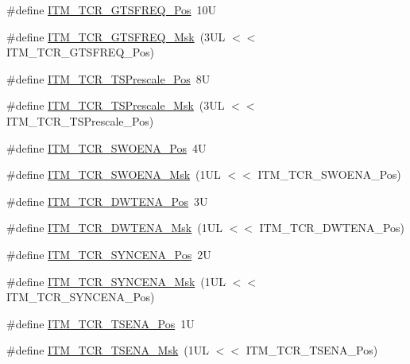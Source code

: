 \begin{DoxyCompactItemize}
\item 
\#define \hyperlink{group___c_m_s_i_s___i_t_m_ga96c7c7cbc0d98426c408090b41f583f1}{I\+T\+M\+\_\+\+T\+C\+R\+\_\+\+G\+T\+S\+F\+R\+E\+Q\+\_\+\+Pos}~10U
\item 
\#define \hyperlink{group___c_m_s_i_s___i_t_m_gade862cf009827f7f6748fc44c541b067}{I\+T\+M\+\_\+\+T\+C\+R\+\_\+\+G\+T\+S\+F\+R\+E\+Q\+\_\+\+Msk}~(3\+U\+L $<$$<$ I\+T\+M\+\_\+\+T\+C\+R\+\_\+\+G\+T\+S\+F\+R\+E\+Q\+\_\+\+Pos)
\item 
\#define \hyperlink{group___c_m_s_i_s___i_t_m_gad7bc9ee1732032c6e0de035f0978e473}{I\+T\+M\+\_\+\+T\+C\+R\+\_\+\+T\+S\+Prescale\+\_\+\+Pos}~8U
\item 
\#define \hyperlink{group___c_m_s_i_s___i_t_m_ga7a723f71bfb0204c264d8dbe8cc7ae52}{I\+T\+M\+\_\+\+T\+C\+R\+\_\+\+T\+S\+Prescale\+\_\+\+Msk}~(3\+U\+L $<$$<$ I\+T\+M\+\_\+\+T\+C\+R\+\_\+\+T\+S\+Prescale\+\_\+\+Pos)
\item 
\#define \hyperlink{group___c_m_s_i_s___i_t_m_ga7a380f0c8078f6560051406583ecd6a5}{I\+T\+M\+\_\+\+T\+C\+R\+\_\+\+S\+W\+O\+E\+N\+A\+\_\+\+Pos}~4U
\item 
\#define \hyperlink{group___c_m_s_i_s___i_t_m_ga97476cb65bab16a328b35f81fd02010a}{I\+T\+M\+\_\+\+T\+C\+R\+\_\+\+S\+W\+O\+E\+N\+A\+\_\+\+Msk}~(1\+U\+L $<$$<$ I\+T\+M\+\_\+\+T\+C\+R\+\_\+\+S\+W\+O\+E\+N\+A\+\_\+\+Pos)
\item 
\#define \hyperlink{group___c_m_s_i_s___i_t_m_ga30e83ebb33aa766070fe3d1f27ae820e}{I\+T\+M\+\_\+\+T\+C\+R\+\_\+\+D\+W\+T\+E\+N\+A\+\_\+\+Pos}~3U
\item 
\#define \hyperlink{group___c_m_s_i_s___i_t_m_ga98ea1c596d43d3633a202f9ee746cf70}{I\+T\+M\+\_\+\+T\+C\+R\+\_\+\+D\+W\+T\+E\+N\+A\+\_\+\+Msk}~(1\+U\+L $<$$<$ I\+T\+M\+\_\+\+T\+C\+R\+\_\+\+D\+W\+T\+E\+N\+A\+\_\+\+Pos)
\item 
\#define \hyperlink{group___c_m_s_i_s___i_t_m_gaa93a1147a39fc63980d299231252a30e}{I\+T\+M\+\_\+\+T\+C\+R\+\_\+\+S\+Y\+N\+C\+E\+N\+A\+\_\+\+Pos}~2U
\item 
\#define \hyperlink{group___c_m_s_i_s___i_t_m_gac89b74a78701c25b442105d7fe2bbefb}{I\+T\+M\+\_\+\+T\+C\+R\+\_\+\+S\+Y\+N\+C\+E\+N\+A\+\_\+\+Msk}~(1\+U\+L $<$$<$ I\+T\+M\+\_\+\+T\+C\+R\+\_\+\+S\+Y\+N\+C\+E\+N\+A\+\_\+\+Pos)
\item 
\#define \hyperlink{group___c_m_s_i_s___i_t_m_ga5aa381845f810114ab519b90753922a1}{I\+T\+M\+\_\+\+T\+C\+R\+\_\+\+T\+S\+E\+N\+A\+\_\+\+Pos}~1U
\item 
\#define \hyperlink{group___c_m_s_i_s___i_t_m_ga436b2e8fa24328f48f2da31c00fc9e65}{I\+T\+M\+\_\+\+T\+C\+R\+\_\+\+T\+S\+E\+N\+A\+\_\+\+Msk}~(1\+U\+L $<$$<$ I\+T\+M\+\_\+\+T\+C\+R\+\_\+\+T\+S\+E\+N\+A\+\_\+\+Pos)

\end{DoxyCompactItemize}
